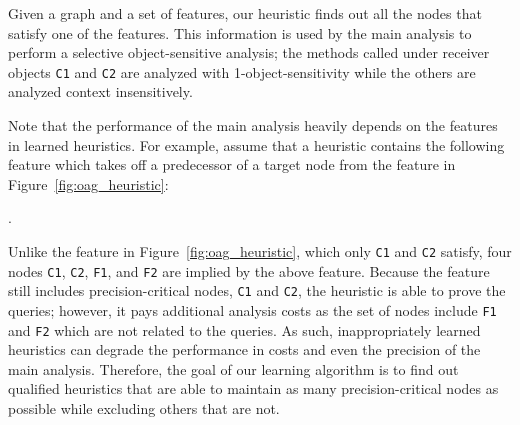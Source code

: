 
Given a graph and a set of features, %
our heuristic finds out all the nodes that satisfy one of the features. This information is used by the main analysis to perform a selective object-sensitive analysis;
the methods called under receiver objects {\tt C1} and {\tt C2} are analyzed with 1-object-sensitivity
while the others are analyzed context insensitively.





Note that the performance of the main analysis heavily depends on the features in learned heuristics.
For example, assume that a heuristic contains the following feature which takes
off a predecessor of a target node from the feature in Figure~\ref{fig:oag_heuristic}:
\begin{center}
.
\end{center}
Unlike the feature in Figure~\ref{fig:oag_heuristic}, which only {\tt C1} and {\tt C2} satisfy,
four nodes {\tt C1}, {\tt C2}, {\tt F1}, and {\tt F2} are implied by the above feature.
Because the feature still includes precision-critical nodes, {\tt C1} and {\tt C2}, the heuristic is able to prove the queries;
however, it pays additional analysis costs as the set of nodes include {\tt F1} and {\tt F2} which are not related to the queries.
As such, inappropriately learned heuristics can degrade the performance in costs and even the precision
of the main analysis.
Therefore, the goal of our learning algorithm is to find out qualified heuristics that are able to maintain as many precision-critical nodes as possible while excluding others that are not.






